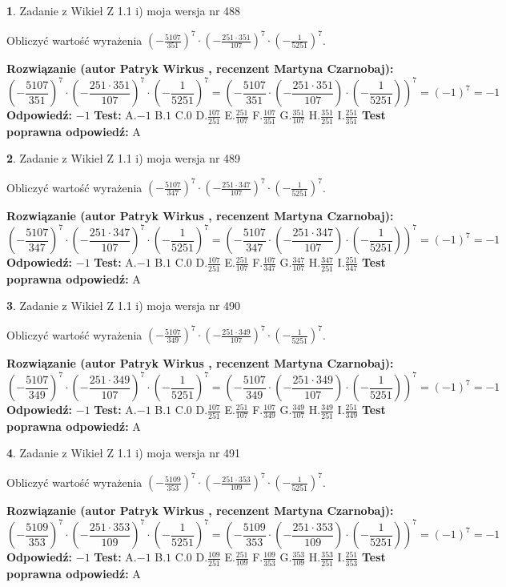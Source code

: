 \documentclass[12pt, a4paper]{article}
\theoremstyle{definition} %
\newtheorem{zad}{}
\newcommand{\zadStart}[1]{\begin{zad}#1\newline}
\newcommand{\zadStop}{\end{zad}}
\newcommand{\rozwStart}[2]{\noindent \textbf{Rozwiązanie (autor #1 , recenzent #2): }\newline}
\newcommand{\rozwStop}{\newline}
\newcommand{\odpStart}{\noindent \textbf{Odpowiedź:}\newline}
\newcommand{\odpStop}{\newline}
\newcommand{\testStart}{\noindent \textbf{Test:}\newline}
\newcommand{\testStop}{\newline}
\newcommand{\kluczStart}{\noindent \textbf{Test poprawna odpowiedź:}\newline}
\newcommand{\kluczStop}{\newline}
\begin{document}
\zadStart{Zadanie z Wikieł Z 1.1 i) moja wersja nr 488}

Obliczyć wartość wyrażenia $(-\frac{5107}{351})^{7} \cdot (-\frac{251 \cdot 351}{107})^{7} \cdot (-\frac{1}{5251})^{7}$.
\zadStop
\rozwStart{Patryk Wirkus}{Martyna Czarnobaj}
$$(-\frac{5107}{351})^{7} \cdot (-\frac{251 \cdot 351}{107})^{7} \cdot (-\frac{1}{5251})^{7} = (-\frac{5107}{351} \cdot (-\frac{251 \cdot 351}{107}) \cdot (-\frac{1}{5251}))^{7} = (-1)^{7} = -1$$
\rozwStop
\odpStart
$-1$
\odpStop
\testStart
A.$-1$ B.$1$ C.$0$ D.$\frac{107}{251}$ E.$\frac{251}{107}$
F.$\frac{107}{351}$ G.$\frac{351}{107}$
H.$\frac{351}{251}$
I.$\frac{251}{351}$
\testStop
\kluczStart
A
\kluczStop



\zadStart{Zadanie z Wikieł Z 1.1 i) moja wersja nr 489}

Obliczyć wartość wyrażenia $(-\frac{5107}{347})^{7} \cdot (-\frac{251 \cdot 347}{107})^{7} \cdot (-\frac{1}{5251})^{7}$.
\zadStop
\rozwStart{Patryk Wirkus}{Martyna Czarnobaj}
$$(-\frac{5107}{347})^{7} \cdot (-\frac{251 \cdot 347}{107})^{7} \cdot (-\frac{1}{5251})^{7} = (-\frac{5107}{347} \cdot (-\frac{251 \cdot 347}{107}) \cdot (-\frac{1}{5251}))^{7} = (-1)^{7} = -1$$
\rozwStop
\odpStart
$-1$
\odpStop
\testStart
A.$-1$ B.$1$ C.$0$ D.$\frac{107}{251}$ E.$\frac{251}{107}$
F.$\frac{107}{347}$ G.$\frac{347}{107}$
H.$\frac{347}{251}$
I.$\frac{251}{347}$
\testStop
\kluczStart
A
\kluczStop



\zadStart{Zadanie z Wikieł Z 1.1 i) moja wersja nr 490}

Obliczyć wartość wyrażenia $(-\frac{5107}{349})^{7} \cdot (-\frac{251 \cdot 349}{107})^{7} \cdot (-\frac{1}{5251})^{7}$.
\zadStop
\rozwStart{Patryk Wirkus}{Martyna Czarnobaj}
$$(-\frac{5107}{349})^{7} \cdot (-\frac{251 \cdot 349}{107})^{7} \cdot (-\frac{1}{5251})^{7} = (-\frac{5107}{349} \cdot (-\frac{251 \cdot 349}{107}) \cdot (-\frac{1}{5251}))^{7} = (-1)^{7} = -1$$
\rozwStop
\odpStart
$-1$
\odpStop
\testStart
A.$-1$ B.$1$ C.$0$ D.$\frac{107}{251}$ E.$\frac{251}{107}$
F.$\frac{107}{349}$ G.$\frac{349}{107}$
H.$\frac{349}{251}$
I.$\frac{251}{349}$
\testStop
\kluczStart
A
\kluczStop



\zadStart{Zadanie z Wikieł Z 1.1 i) moja wersja nr 491}

Obliczyć wartość wyrażenia $(-\frac{5109}{353})^{7} \cdot (-\frac{251 \cdot 353}{109})^{7} \cdot (-\frac{1}{5251})^{7}$.
\zadStop
\rozwStart{Patryk Wirkus}{Martyna Czarnobaj}
$$(-\frac{5109}{353})^{7} \cdot (-\frac{251 \cdot 353}{109})^{7} \cdot (-\frac{1}{5251})^{7} = (-\frac{5109}{353} \cdot (-\frac{251 \cdot 353}{109}) \cdot (-\frac{1}{5251}))^{7} = (-1)^{7} = -1$$
\rozwStop
\odpStart
$-1$
\odpStop
\testStart
A.$-1$ B.$1$ C.$0$ D.$\frac{109}{251}$ E.$\frac{251}{109}$
F.$\frac{109}{353}$ G.$\frac{353}{109}$
H.$\frac{353}{251}$
I.$\frac{251}{353}$
\testStop
\kluczStart
A
\kluczStop
\end{document}
